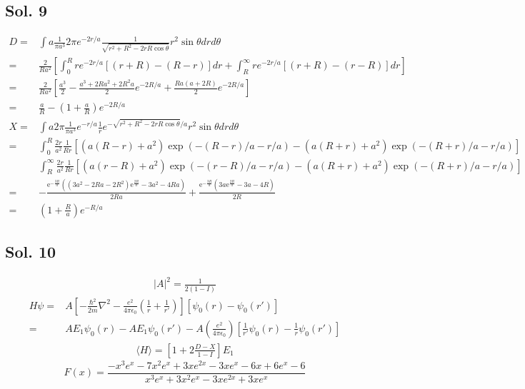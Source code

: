 \subsection*{Sol. 9}
\begin{align*}
    D =& \int a\frac{1}{\pi a^3}2\pi e^{-2r/a}\frac{1}{\sqrt{r^2+R^2-2rR\cos\theta}}r^2\sin\theta drd\theta \\
    =&
    \frac{2}{Ra^2}
    \left[
    \int_0^R 
    re^{-2r/a}[(r+R)-(R-r)]dr+
    \int_R^\infty
    re^{-2r/a}[(r+R)-(r-R)]dr
    \right]\\
    =&
    \frac{2}{Ra^2}
    \left[
    \frac{a^3}{2}-\frac{a^3+2Ra^2+2R^2a}{2}e^{-2R/a}
    +\frac{Ra(a+2R)}{2}e^{-2R/a}
    \right]\\
    =&\frac{a}{R}-\left(1+\frac{a}{R}\right)e^{-2R/a}
\end{align*}
\begin{align*}
    X =& \int a2\pi \frac{1}{\pi a^3}e^{-r/a}\frac{1}{r}e^{-\sqrt{r^2+R^2-2rR\cos\theta }/a}r^2\sin\theta drd\theta \\
    =&
    \int_0^R\frac{2r}{a^2}\frac{1}{Rr}
    [(a(R-r)+a^2)\exp(-(R-r)/a-r/a)
    -
    (a(R+r)+a^2)\exp(-(R+r)/a-r/a)
    ]\\
    &
    \int_R^\infty \frac{2r}{a^2}\frac{1}{Rr}
    [(a(r-R)+a^2)\exp(-(r-R)/a-r/a)
    -
    (a(R+r)+a^2)\exp(-(R+r)/a-r/a)
    ]\\
    =&
    -\frac{\mathrm{e}^{-\frac{3R}{a}} \left(\left(3a^{2} - 2Ra - 2R^{2}\right) \mathrm{e}^{\frac{2R}{a}} - 3a^{2} - 4Ra\right)}{2Ra}+\frac{\mathrm{e}^{-\frac{3R}{a}} \left(3a\mathrm{e}^{\frac{2R}{a}} - 3a - 4R\right)}{2R}\\
    =&
    \left( 1+ \frac{R}{a}\right)e^{-R/a}
\end{align*}

\subsection*{Sol. 10}
\begin{align*}
    |A|^2 = \frac{1}{2(1-I)}
\end{align*}
\begin{align*}
    H\psi =& 
    A\left[
    -\frac{\hbar^2}{2m}\nabla^2 - \frac{e^2}{4\pi\epsilon_0}
    \left(\frac{1}{r} + \frac{1}{r'}\right)
    \right][\psi_0(r)-\psi_0(r')]\\
    =&AE_1\psi_0(r)-AE_1\psi_0(r')
    -A\left(\frac{e^2}{4\pi\epsilon_0}\right)
    \left[
    \frac{1}{r'}\psi_0(r) - \frac{1}{r}\psi_0(r')
    \right]
\end{align*}
\begin{align*}
    \langle H\rangle
    =\left[1+2\frac{D-X}{1-I}\right]E_1
\end{align*}
$$
F(x) = \frac{- x^{3} e^{x} - 7 x^{2} e^{x} + 3 x e^{2 x} - 3 x e^{x} - 6 x + 6 e^{x} - 6}{x^{3} e^{x} + 3 x^{2} e^{x} - 3 x e^{2 x} + 3 x e^{x}}
$$

